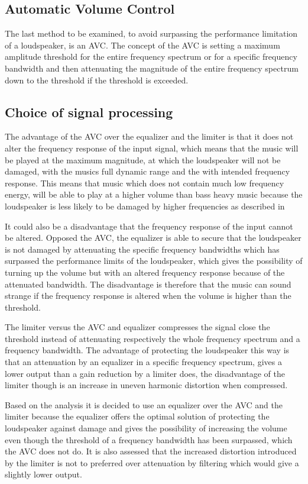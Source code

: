 \subsection{Automatic Volume Control}
The last method to be examined, to avoid surpassing the performance limitation of a loudspeaker, is an \gls{AVC}. The concept of the AVC is setting a maximum amplitude threshold for the entire frequency spectrum or for a specific frequency bandwidth and then attenuating the magnitude of the entire frequency spectrum down to the threshold if the threshold is exceeded.

\subsection{Choice of signal processing}
The advantage of the AVC over the equalizer and the limiter is that it does not alter the frequency response of the input signal, which means that the music will be played at the maximum magnitude, at which the loudspeaker will not be damaged, with the musics full dynamic range and the with intended frequency response. This means that music which does not contain much low frequency energy, will be able to play at a higher volume than bass heavy music because the loudspeaker is less likely to be damaged by higher frequencies as described in 

It could also be a disadvantage that the frequency response of the input cannot be altered. Opposed the AVC, the equalizer is able to secure that the loudspeaker is not damaged by attenuating the specific frequency bandwidths which has surpassed the performance limits of the loudspeaker, which gives the possibility of turning up the volume but with an altered frequency response because of the attenuated bandwidth. The disadvantage is therefore that the music can sound strange if the frequency response is altered when the volume is higher than the threshold.

The limiter versus the AVC and equalizer compresses the signal close the threshold instead of attenuating respectively the whole frequency spectrum and a frequency bandwidth. The advantage of protecting the loudspeaker this way is that an attenuation by an equalizer in a specific frequency spectrum, gives a lower output than a gain reduction by a limiter does, the disadvantage of the limiter though is an increase in uneven harmonic distortion when compressed. 

Based on the analysis it is decided to use an equalizer over the AVC and the limiter because the equalizer offers the optimal solution of protecting the loudspeaker against damage and gives the possibility of increasing the volume even though the threshold of a frequency bandwidth has been surpassed, which the AVC does not do. It is also assessed that the increased distortion introduced by the limiter is not to preferred over attenuation by filtering which would give a slightly lower output.  


      